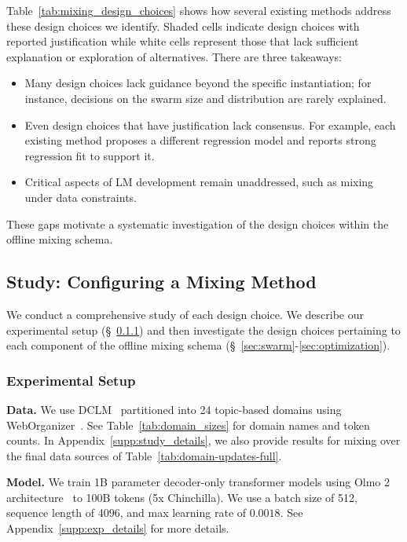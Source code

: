 Table~\ref{tab:mixing_design_choices} shows how several existing methods address these design choices we identify. Shaded cells indicate design choices with reported justification while white cells represent those that lack sufficient explanation or exploration of alternatives. There are three takeaways:
\begin{itemize}[itemsep=0.00pt,topsep=0pt,leftmargin=12pt]
\item Many design choices lack guidance beyond the specific
instantiation; for instance, decisions on the swarm size
and distribution are rarely explained.
\item Even design choices that have justification lack consensus. For example, each existing method proposes a different regression model and reports strong regression fit to support it.
\item Critical aspects of LM development remain unaddressed, such as mixing under data constraints.
\end{itemize}

These gaps motivate a systematic investigation of the design choices within the offline mixing schema. 




\subsection{\olmix Study: Configuring a Mixing Method}\label{sec:study}


We conduct a comprehensive study of each design choice. 
We describe our experimental setup (\S~\ref{sec:study_setting}) and then investigate the design choices pertaining to each component of the offline mixing schema (\S~\ref{sec:swarm}-\ref{sec:optimization}).

\subsubsection{Experimental Setup}\label{sec:study_setting}

\textbf{Data.} We use DCLM~\citep{dclm} partitioned into 24 topic-based domains using WebOrganizer~\citep{wettig2025organizewebconstructingdomains}. See Table~\ref{tab:domain_sizes} for domain names and token counts. In Appendix~\ref{supp:study_details}, we also provide results for mixing over the final data sources of Table~\ref{tab:domain-updates-full}. 

\textbf{Model.} We train 1B parameter decoder-only transformer models using Olmo 2 architecture~\citep{olmo20242olmo2furious} to 100B tokens (5x Chinchilla). We use a batch size of 512, sequence length of 4096, and max learning rate of $0.0018$. See Appendix~\ref{supp:exp_details} for more details. 

